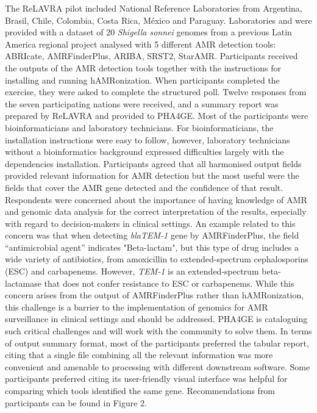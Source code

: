 The ReLAVRA pilot included National Reference Laboratories from Argentina, Brasil, Chile, Colombia, Costa Rica, México and Paraguay. Laboratories and were provided with a dataset of 20 \textit{Shigella sonnei} genomes from a previous Latin America regional project analysed with 5 different AMR detection tools: ABRIcate, AMRFinderPlus, ARIBA, SRST2, StarAMR. Participants received the outputs of the AMR detection tools together with the instructions for installing and running hAMRonization. When participants completed the exercise, they were asked to complete the structured poll. Twelve responses from the seven participating nations were received, and a summary report was prepared by ReLAVRA and provided to PHA4GE. Most of the participants were bioinformaticians and laboratory technicians. For bioinformaticians, the installation instructions were easy to follow, however, laboratory technicians without a bioinformatics background expressed difficulties largely with the dependencies installation. Participants agreed that all harmonised output fields provided relevant information for AMR detection but the most useful were the fields that cover the AMR gene detected and the confidence of that result. Respondents were concerned about the importance of having knowledge of AMR and genomic data analysis for the correct interpretation of the results, especially with regard to decision-makers in clinical settings. An example related to this concern was that when detecting \textit{blaTEM-1} gene by AMRFinderPlus, the field “antimicrobial agent” indicates "Beta-lactam", but this type of drug includes a wide variety of antibiotics, from amoxicillin to extended-spectrum cephalosporins (ESC) and carbapenems. However, \textit{TEM-1} is an extended-spectrum beta-lactamase that does not confer resistance to ESC or carbapenems. While this concern arises from the output of AMRFinderPlus rather than hAMRonization, this challenge is a barrier to the implementation of genomics for AMR surveillance in clinical settings and should be addressed. PHA4GE is cataloguing such critical challenges and will work with the community to solve them. In terms of output summary format, most of the participants preferred the tabular report, citing that a single file combining all the relevant information was more convenient and amenable to processing with different downstream software. Some participants preferred citing its user-friendly visual interface was helpful for comparing which tools identified the same gene. Recommendations from participants can be found in Figure 2.

